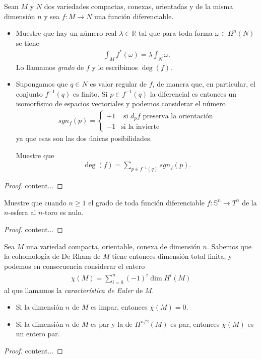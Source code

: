 \documentclass[11pt]{article}
\newcommand{\R}{\mathbb{R}}
\newcommand{\Ss}{\mathbb{S}}
\newcommand{\paint}[1]{\color{color}{#1}}
\newenvironment{exercise}[2][Ejercicio]{\begin{trivlist}
\item[\hskip \labelsep \paint{{\bfseries #1}}\hskip \labelsep {\bfseries #2.}]}{\end{trivlist}}
\begin{document}
\begin{exercise}{2} Sean $M$ y $N$ dos variedades compactas, conexas, orientadas y de la misma dimensión $n$ y sea $f : M \to N$ una función diferenciable.
\begin{itemize}
\item[(a)] Muestre que hay un número real $\lambda \in \R$ tal que para toda forma $\omega \in \Omega^n(N)$ se tiene 
\begin{align*}
\int_Mf^*(\omega) = \lambda\int_N \omega.
\end{align*}
Lo llamamos \textit{grado} de $f$ y lo escribimos $\deg(f)$.
\item[(b)] Supongamos que $q \in N$ es valor regular de $f$, de manera que, en particular, el conjunto $f^{-1}(q)$ es finito. Si $p \in f^{-1}(q)$ la diferencial es entonces un isomorfismo de espacios vectoriales y podemos considerar el número
\begin{align*}
sgn_f(p) = \begin{cases}
+1&\text{ si $d_pf$ preserva la orientación}\\
-1&\text{si la invierte}
\end{cases}
\end{align*}
ya que esas son las dos únicas posibilidades.

Muestre que
\begin{align*}
\deg(f) = \sum_{p \in f^{-1}(q)}sgn_f(p).
\end{align*}
\end{itemize}
\end{exercise}
\begin{proof}
content...
\end{proof}

\begin{exercise}{3} Muestre que cuando $n \geq 1$ el grado de toda función diferenciable $f : \Ss^n \to T^n$ de la $n$-esfera al $n$-toro es nulo.
\end{exercise}
\begin{proof}
content...
\end{proof}

\begin{exercise}{4} Sea $M$ una variedad compacta, orientable, conexa de dimensión $n$. Sabemos que la cohomología de De Rham de $M$ tiene entonces dimensión total finita, y podemos en consecuencia considerar el entero
\begin{align*}
\chi(M) = \sum_{i=0}^{n}(-1)^i \dim H^i(M)
\end{align*}
al que llamamos la \textit{característica de Euler} de $M$.
\begin{itemize}
\item[(a)] Si la dimensión $n$ de $M$ es impar, entonces $\chi(M) = 0$.
\item[(b)] Si la dimensión $n$ de $M$ es par y la de $H^{n/2}(M)$ es par, entonces $\chi(M)$ es un entero par.
\end{itemize}
\end{exercise}
\begin{proof}
content...
\end{proof}
\end{document}
